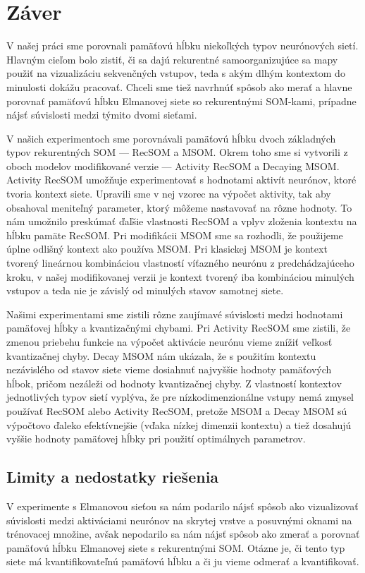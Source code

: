 \chapter*{Záver}
V našej práci sme porovnali pamäťovú hĺbku niekoľkých typov neurónových sietí.
Hlavným cieľom bolo zistiť, či sa dajú rekurentné samoorganizujúce sa mapy použiť na vizualizáciu
sekvenčných vstupov, teda s akým dlhým kontextom do minulosti dokážu pracovať. Chceli sme tiež navrhnúť 
spôsob ako merať a hlavne porovnať pamäťovú hĺbku Elmanovej siete so rekurentnými SOM-kami, prípadne 
nájsť súvislosti medzi týmito dvomi sieťami.

V našich experimentoch sme porovnávali pamäťovú hĺbku dvoch základných typov rekurentných 
SOM --- RecSOM a MSOM. Okrem toho sme si vytvorili z oboch modelov modifikované verzie --- Activity RecSOM a Decaying MSOM.
Activity RecSOM umožňuje experimentovať s hodnotami aktivít neurónov, ktoré tvoria kontext siete. Upravili sme v nej
vzorec na výpočet aktivity, tak aby obsahoval meniteľný parameter, ktorý môžeme nastavovať na rôzne hodnoty.
To nám umožnilo preskúmať ďaľšie vlastnosti RecSOM a vplyv zloženia kontextu na hĺbku pamäte RecSOM.
Pri modifikácii MSOM sme sa rozhodli, že použijeme úplne odlišný kontext ako používa MSOM. Pri klasickej MSOM
je kontext tvorený lineárnou kombináciou vlastností víťazného neurónu z predchádzajúceho kroku, v našej modifikovanej 
verzii je kontext tvorený iba kombináciou minulých vstupov a teda nie je závislý od minulých stavov samotnej siete.

Našimi experimentami sme zistili rôzne zaujímavé súvislosti medzi hodnotami pamäťovej hĺbky a kvantizačnými chybami.
Pri Activity RecSOM sme zistili, že zmenou priebehu funkcie na výpočet aktivácie neurónu vieme znížiť 
veľkosť kvantizačnej chyby.
Decay MSOM nám ukázala, že s použitím kontextu nezávislého od stavov siete vieme dosiahnuť najvyššie hodnoty pamäťových hĺbok, pričom nezáleži od
hodnoty kvantizačnej chyby.
Z vlastností kontextov jednotlivých typov sietí vyplýva, že pre nízkodimenzionálne vstupy nemá zmysel používať RecSOM alebo Activity RecSOM, pretože 
MSOM a Decay MSOM sú výpočtovo ďaleko efektívnejšie (vďaka nízkej dimenzii kontextu) a tiež dosahujú vyššie hodnoty pamäťovej hĺbky pri použití optimálnych parametrov.


\section{Limity a nedostatky riešenia}
V experimente s Elmanovou sieťou sa nám podarilo nájsť spôsob ako vizualizovať súvislosti medzi 
aktiváciami neurónov na skrytej vrstve a posuvnými oknami na trénovacej množine, avšak 
nepodarilo sa nám nájsť spôsob ako zmerať a porovnať pamäťovú hĺbku Elmanovej siete s rekurentnými SOM.
Otázne je, či tento typ siete má kvantifikovateľnú pamäťovú hĺbku a či ju vieme odmerať a kvantifikovať.

